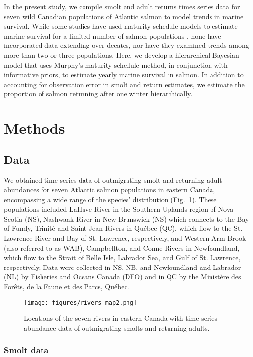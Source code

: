\documentclass[12pt]{article}
\begin{document}
In the present study, we compile smolt and adult returns times series data for seven wild
Canadian populations of Atlantic salmon to model trends in marine survival.
While some studies have used maturity-schedule models to estimate marine
survival for a limited number of salmon populations \citep{Chaput2003b}, none
have incorporated data extending over decates, nor have they examined
trends among more than two or three populations. 
Here, we develop a hierarchical Bayesian model that uses Murphy's maturity
schedule method, in conjunction with informative priors, to estimate yearly
marine survival in salmon. In addition to accounting for observation error in
smolt and return estimates, we estimate the proportion of salmon returning
after one winter hierarchically.

\section*{Methods}

\subsection*{Data}

We obtained time series data of outmigrating smolt and returning adult
abundances for seven Atlantic salmon populations in eastern Canada, encompassing a
wide range of the species' distribution (Fig.~\ref{fig:map}). These
populations included LaHave River in the Southern Uplands region of Nova
Scotia (NS), Nashwaak River in New Brunswick (NS) which connects to the
Bay of Fundy, Trinit\'{e} and Saint-Jean Rivers in Qu\'{e}bec (QC), which
flow to the St. Lawrence River and Bay of St. Lawrence, respectively, and
Western Arm Brook (also referred to as WAB), Campbellton, and Conne Rivers in Newfoundland, which flow to the
Strait of Belle Isle, Labrador Sea, and Gulf of St. Lawrence, respectively.
Data were collected in NS, NB, and Newfoundland
and Labrador (NL) by Fisheries and Oceans Canada (DFO) and in QC
by the Minist\`{e}re des For\^{e}ts, de la Faune et des Parcs, Qu\'{e}bec.

\begin{figure}[htbp] \centering
    \texttt{[image: figures/rivers-map2.png]}
    \caption{Locations of the seven rivers in eastern Canada with time series abundance data of outmigrating smolts and 
    returning adults.} \label{fig:map} 
\end{figure}

\subsubsection*{Smolt data}
\end{document}
